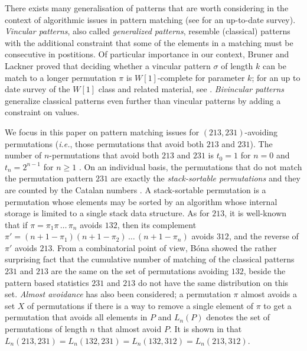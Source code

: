 \documentclass[a4paper]{llncs}
\newcounter{num}
\begin{document}
	There exists many generalisation of patterns that are worth considering
	in the context of algorithmic issues in pattern matching
	(see \cite{Kitaev:book:2011} for an up-to-date survey).
	\emph{Vincular patterns}, also called
	\emph{generalized patterns},
	resemble (classical) patterns with the additional constraint that some of the elements in
	a matching must be consecutive in postitions.
	Of particular importance in our context,
	Bruner and Lackner \cite{DBLP:journals/corr/abs-1204-5224}
	proved that deciding whether a vincular pattern
	$\sigma$ of length $k$ can be match to a longer permutation
	$\pi$ is $W[1]$-complete for
	parameter $k$;
	for an up to date survey of the $W[1]$ class and related material, see
	\cite{Downey:Fellows:2013}.
	\emph{Bivincular patterns} generalize classical patterns even further
	than vincular
	patterns by adding a constraint on values.

	We focus in this paper on pattern matching issues for
	$(213,231)$-avoiding permutations
    (\emph{i.e.}, those permutations that avoid both $213$ and $231$).
	The number of $n$-permutations that avoid both
	$213$ and $231$ is
	$t_0 = 1$ for $n = 0$ and
	$t_n =2^{n-1}$ for $n\geq 1$ \cite{Simion:Schmidt:EJC:1985}.
	On an individual basis,
	the permutations that do not match the permutation pattern $231$
	are exactly the \emph{stack-sortable permutations} and they are counted by
	the Catalan numbers \cite{Knuth:1997:ACP:260999}.
	A stack-sortable permutation is a permutation whose elements may be sorted by
	an algorithm whose internal storage is limited to a single stack data structure.
	As for $213$, it is well-known that
 	if $\pi = \pi_1\pi\,\ldots\,\pi_n$ avoids $132$, then its complement
 	$\pi' = (n+1-\pi_1)(n+1-\pi_2)\,\ldots\,(n+1-\pi_n)$ avoids $312$, and
 	the reverse of $\pi'$ avoids $213$.
 	From a combinatorial point of view,
 	B\'ona \cite{Bona:ElJC:2012}
 	showed the rather surprising fact that the cumulative number of
 	matching of the classical patterns $231$ and $213$ are the same on the
 	set of permutations avoiding $132$,
 	beside the pattern based statistics $231$ and $213$
 	do not have the same distribution on this set.
 	\emph{Almost avoidance} has also been considered;
 	a permutation $\pi$ almost avoids a set $X$ of permutations
 	if there is a way to remove a single element of $\pi$ to get a permutation
 	that avoids all elements in $P$
 	and $L_n(P)$ denotes the set of permutations of length $n$ that almost avoid
 	$P$.
 	It is shown in \cite{Griffiths:Smith:Warren:PMA:2011} that
 	$L_n(213, 231) = L_n(132, 231) = L_n(132, 312) = L_n(213, 312)$.
\end{document}
